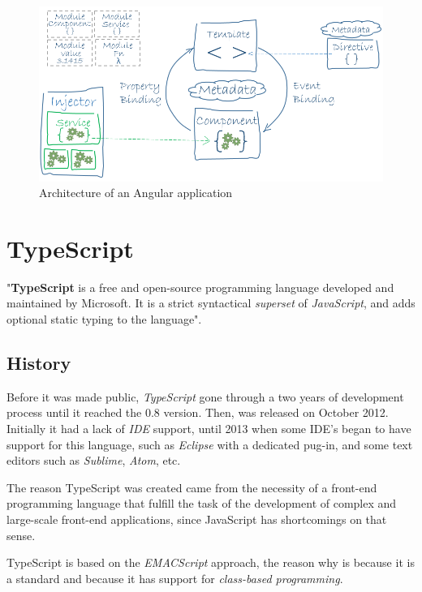 \documentclass[a4paper, 12pt, english]{book}
\begin{document}
\begin{figure}
  \centering
  \includegraphics[width=13cm, keepaspectratio]{img/angular-architecture}
  \caption{Architecture of an Angular application}
  \label{fig:angular-architecture}
\end{figure}


\section{TypeScript}
\label{sec:typeScript}

"\textbf{TypeScript} is a free and open-source programming language developed and maintained by Microsoft. It is a strict syntactical \textit{superset} of \textit{JavaScript}, and adds optional static typing to the language".

\subsection{History}
\label{sec:typescript-history}

Before it was made public, \textit{TypeScript} gone through a two years of development process until it reached the 0.8 version. Then, was released on October 2012. Initially it had a lack of \textit{IDE} support, until 2013 when some IDE's began to have support for this language, such as \textit{Eclipse} with a dedicated pug-in, and some text editors such as \textit{Sublime}, \textit{Atom}, etc.

The reason TypeScript was created came from the necessity of a front-end programming language that fulfill the task of the development of complex and large-scale front-end applications, since JavaScript has shortcomings on that sense.

TypeScript is based on the \textit{EMACScript} approach, the reason why is because it is a standard and because it has support for \textit{class-based programming}.
\end{document}
